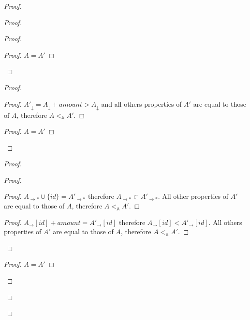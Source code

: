 \documentclass[9pt, oneside]{article}   	%
\begin{document}
\begin{proof}
\begin{proof}
\begin{proof}
			\begin{proof}
				$A=A'$
			\end{proof}
		\end{proof}
		
		\begin{proof}
			\begin{proof}
				$A'_\downarrow = A_\downarrow + \textit{amount} > A_\downarrow$ and all others properties of $A'$ are equal to those of $A$, therefore $A <_\mathds{A} A'$. 
			\end{proof}
			
			\begin{proof}
				$A=A'$
			\end{proof}
		\end{proof}
		
		\begin{proof}
			\begin{proof}
				\begin{proof}
					$A_{\rightarrow *} \cup \{ \textit{id} \} = A'_{\rightarrow *}$ therefore $A_{\rightarrow *} \subset A'_{\rightarrow *}$. All other properties of $A'$ are equal to those of $A$, therefore $A <_\mathds{A} A'$.
				\end{proof}
				
				\begin{proof}
					$A_\rightarrow[id] + \textit{amount} = A'_\rightarrow[id]$ therefore $A_\rightarrow[id] < A'_\rightarrow[id]$. All others properties of $A'$ are equal to those of $A$, therefore $A <_\mathds{A} A'$.
				\end{proof} 
			\end{proof}
			
			\begin{proof}
				$A=A'$
			\end{proof}
		\end{proof}
		

\end{proof}
\end{proof}
\end{document}
